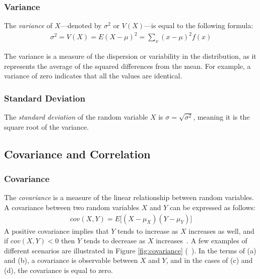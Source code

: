 \subsubsection{Variance}

The \textit{variance} of $X$---denoted by $\sigma^2$ or $V(X)$---is equal to the following formula:
\begin{align}
	\sigma^2 = V(X) = E(X - \mu)^2 = \sum_{x}(x - \mu)^2 f(x)
\end{align}

The variance is a measure of the dispersion or variability in the distribution, as it represents the average of the squared differences from the mean. For example, a variance of zero indicates that all the values are identical.

\subsubsection{Standard Deviation}

The \textit{standard deviation} of the random variable $X$ is $\sigma = \sqrt{\sigma^2}$, meaning it is the square root of the variance.

\subsection{Covariance and Correlation}

\subsubsection{Covariance}
The \textit{covariance} is a measure of the linear relationship between random variables. A covariance between two random variables $X$ and $Y$ can be expressed as follows:
\begin{align}
	cov(X,Y) = E\big[(X - \mu_X)(Y - \mu_Y)\big]
\end{align}
A positive covariance implies that $Y$ tends to increase as $X$ increases as well, and if $cov(X,Y) < 0$ then $Y$ tends to decrease as $X$ increases~\cite{covariance}. A few examples of different scenarios are illustrated in Figure \ref{fig:covariance} (~\cite{statistics_book}). In the terms of (a) and (b), a covariance is observable between $X$ and $Y$, and in the cases of (c) and (d), the covariance is equal to zero.

